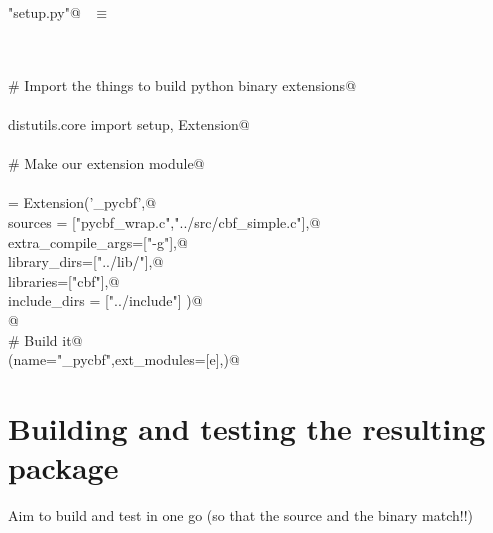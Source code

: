 \documentclass[10pt,a4paper,twoside,notitlepage]{article}
\begin{document}
\begin{flushleft} \small \label{scrap13}
\verb@"setup.py"@\nobreak\ {\footnotesize {} }$\equiv$
\vspace{-1ex}
\begin{list}{}{} \item
\mbox{}\verb@@\\
\mbox{}\verb@@\\
\mbox{}\verb@# Import the things to build python binary extensions@\\
\mbox{}\verb@@\\
\mbox{}\verb@from distutils.core import setup, Extension@\\
\mbox{}\verb@@\\
\mbox{}\verb@# Make our extension module@\\
\mbox{}\verb@@\\
\mbox{}\verb@e = Extension('_pycbf',@\\
\mbox{}\verb@              sources = ["pycbf_wrap.c","../src/cbf_simple.c"],@\\
\mbox{}\verb@         extra_compile_args=["-g"],@\\
\mbox{}\verb@         library_dirs=["../lib/"],@\\
\mbox{}\verb@         libraries=["cbf"],@\\
\mbox{}\verb@         include_dirs = ["../include"] )@\\
\mbox{}\verb@            @\\
\mbox{}\verb@# Build it@\\
\mbox{}\verb@setup(name="_pycbf",ext_modules=[e],)@\\
\mbox{}\verb@@{\NWsep}
\end{list}
\vspace{-2ex}
\end{flushleft}
\section{Building and testing the resulting package}

Aim to build and test in one go (so that the source and the binary match!!)
\end{document}
